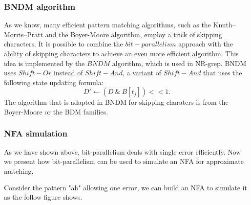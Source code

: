 \subsubsection{BNDM algorithm}
As we know, many efficient pattern matching algorithms, such as the Knuth–Morris–Pratt and the Boyer-Moore algorithm, employ a trick of skipping characters. It is possible to combine the $bit-parallelism$ approach with the ability of skipping characters to achieve an even more efficient algorithm. This idea is implemented by the $BNDM$ algorithm, which is used in NR-grep. BNDM uses $Shift-Or$ instead of $Shift-And$, a variant of $Shift-And$ that uses the following state updating formula:  
$$ D' \leftarrow  (D \ \& \ B[t_j]) << 1 .$$ The algorithm that is adapted in BNDM for skipping charaters is from the Boyer-Moore or the BDM families\cite{crochemore94}.


\subsubsection{NFA simulation}
As we have shown above, bit-parallelism deals with single error efficiently.
Now we present how bit-parallelism can be used to simulate an NFA for approximate matching. 

Consider the pattern "ab" allowing one error, we can build an NFA to simulate it as the follow figure shows.

